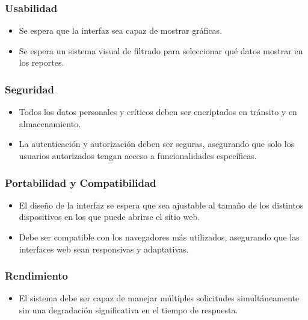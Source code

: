 \documentclass{report}
\begin{document}
    \subsubsection*{Usabilidad}
    \begin{itemize}
        \item Se espera que la interfaz sea capaz de mostrar gráficas.
        \item Se espera un sistema visual de filtrado para seleccionar qué datos mostrar en los reportes.
    \end{itemize}

    \subsubsection*{Seguridad}
    \begin{itemize}
        \item Todos los datos personales y críticos deben ser encriptados en tránsito y en almacenamiento.
        \item La autenticación y autorización deben ser seguras, asegurando que solo los usuarios autorizados tengan 
        acceso a funcionalidades específicas.
    \end{itemize}

    \subsubsection*{Portabilidad y Compatibilidad}
    \begin{itemize}
        \item El diseño de la interfaz se espera que sea ajustable al tamaño de los distintos dispositivos en los que 
        puede abrirse el sitio web.
        \item Debe ser compatible con los navegadores más utilizados, asegurando que las interfaces web sean 
        responsivas y adaptativas.
    \end{itemize}

    \subsubsection*{Rendimiento}
    \begin{itemize}
        \item El sistema debe ser capaz de manejar múltiples solicitudes simultáneamente sin una degradación 
        significativa en el tiempo de respuesta.
    \end{itemize}
\end{document}
